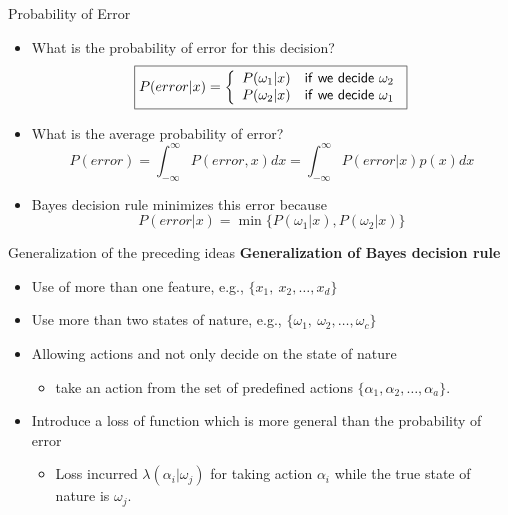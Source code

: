 \begin{frame}{Probability of Error}
\begin{itemize}
\item What is the probability of error for this decision?
\begin{equation}
\boxed{P(error|x)=\left\{ {\begin{array}{*{20}{c}}
{P(\omega_1|x)}&{{\sf if~we~decide~}\omega_2}\\
{P(\omega_2|x)}&{{\sf if~we~decide~}\omega_1}
\end{array}} \right.\nonumber}
\end{equation}
\item What is the average probability of error?
\[P(error)=\int_{-\infty}^{\infty}P(error,x)dx=\int_{-\infty}^{\infty}P(error|x)p(x)dx\]
\item Bayes decision rule minimizes this error because
\[P(error|x)=\min\{P(\omega_1|x),P(\omega_2|x)\}\]
\end{itemize}
\end{frame}

\begin{frame}{Generalization of the preceding ideas}
\textbf{\color{mycolor1}Generalization of Bayes decision rule}
\begin{itemize}
\setlength{\itemsep}{8pt}
\item Use of more than one feature, e.g., $\{x_1,~x_2,\ldots ,x_d\}$
\item Use more than two states of nature, e.g., $\{\omega_1,~\omega_2,\ldots ,\omega_c\}$
\item Allowing actions and not only decide on the state of nature
\begin{itemize}
\item take an action from the set of predefined actions $\{\alpha_1,\alpha_2,\ldots,\alpha_a\}$.
\end{itemize}
\item Introduce a loss of function which is more general than the probability of error
\begin{itemize}
\item Loss incurred $\lambda (\alpha_i|\omega_j)$ for taking action $\alpha_i$ while the true state of nature is $\omega_j$.
\end{itemize}
\end{itemize}
\end{frame}

